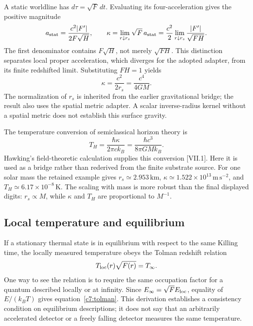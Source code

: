 A static worldline has $d\tau=\sqrt F\,dt$. Evaluating its four-acceleration gives the positive magnitude
\begin{equation}
 a_{\rm stat}=\frac{c^2|F'|}{2F\sqrt H},\qquad
 \kappa=\lim_{r\downarrow r_s}\sqrt F\,a_{\rm stat}
       =\frac{c^2}{2}\lim_{r\downarrow r_s}\frac{|F'|}{\sqrt{FH}}.
 \label{c7:acceleration}
\end{equation}
The first denominator contains $F\sqrt H$, not merely $\sqrt{FH}$. This distinction separates local proper acceleration, which diverges for the adopted adapter, from its finite redshifted limit. Substituting $FH=1$ yields
\begin{equation}
 \kappa=\frac{c^2}{2r_s}=\frac{c^4}{4GM}.
 \label{c7:kappa}
\end{equation}
The normalization of $r_s$ is inherited from the earlier gravitational bridge; the result also uses the spatial metric adapter. A scalar inverse-radius kernel without a spatial metric does not establish this surface gravity.

The temperature conversion of semiclassical horizon theory is
\begin{equation}
 T_H=\frac{\hbar\kappa}{2\pi ck_B}
     =\frac{\hbar c^3}{8\pi GMk_B}.
 \label{c7:temperature}
\end{equation}
Hawking's field-theoretic calculation supplies this conversion [VII.1]. Here it is used as a bridge rather than rederived from the finite substrate source. For one solar mass the retained example gives $r_s\simeq2.953\,\mathrm{km}$, $\kappa\simeq1.522\times10^{13}\,\mathrm{m\,s^{-2}}$, and $T_H\simeq6.17\times10^{-8}\,\mathrm K$. The scaling with mass is more robust than the final displayed digits: $r_s\propto M$, while $\kappa$ and $T_H$ are proportional to $M^{-1}$.

\subsection{Local temperature and equilibrium}
If a stationary thermal state is in equilibrium with respect to the same Killing time, the locally measured temperature obeys the Tolman redshift relation
\begin{equation}
 T_{\rm loc}(r)\sqrt{F(r)}=T_\infty.
 \label{c7:tolman}
\end{equation}
One way to see the relation is to require the same occupation factor for a quantum described locally or at infinity. Since $E_\infty=\sqrt F E_{\rm loc}$, equality of $E/(k_BT)$ gives equation~\eqref{c7:tolman}. This derivation establishes a consistency condition on equilibrium descriptions; it does not say that an arbitrarily accelerated detector or a freely falling detector measures the same temperature.

